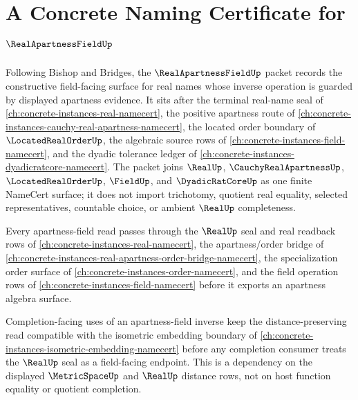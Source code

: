 \chapter{A Concrete Naming Certificate for $\RealApartnessFieldUp$}
\label{ch:concrete-instances-real-apartness-field-namecert}

Following Bishop and Bridges, the $\RealApartnessFieldUp$ packet records the constructive field-facing surface for real names whose inverse operation is guarded by displayed apartness evidence. It sits after the terminal real-name seal of \autoref{ch:concrete-instances-real-namecert}, the positive apartness route of \autoref{ch:concrete-instances-cauchy-real-apartness-namecert}, the located order boundary of $\LocatedRealOrderUp$, the algebraic source rows of \autoref{ch:concrete-instances-field-namecert}, and the dyadic tolerance ledger of \autoref{ch:concrete-instances-dyadicratcore-namecert}. The packet joins $\RealUp$, $\CauchyRealApartnessUp$, $\LocatedRealOrderUp$, $\FieldUp$, and $\DyadicRatCoreUp$ as one finite NameCert surface; it does not import trichotomy, quotient real equality, selected representatives, countable choice, or ambient $\RealUp$ completeness.

Every apartness-field read passes through the $\RealUp$ seal and real readback rows of \autoref{ch:concrete-instances-real-namecert}, the apartness/order bridge of \autoref{ch:concrete-instances-real-apartness-order-bridge-namecert}, the specialization order surface of \autoref{ch:concrete-instances-order-namecert}, and the field operation rows of \autoref{ch:concrete-instances-field-namecert} before it exports an apartness algebra surface.

Completion-facing uses of an apartness-field inverse keep the distance-preserving read compatible with the isometric embedding boundary of \autoref{ch:concrete-instances-isometric-embedding-namecert} before any completion consumer treats the $\RealUp$ seal as a field-facing endpoint. This is a dependency on the displayed $\MetricSpaceUp$ and $\RealUp$ distance rows, not on host function equality or quotient completion.

